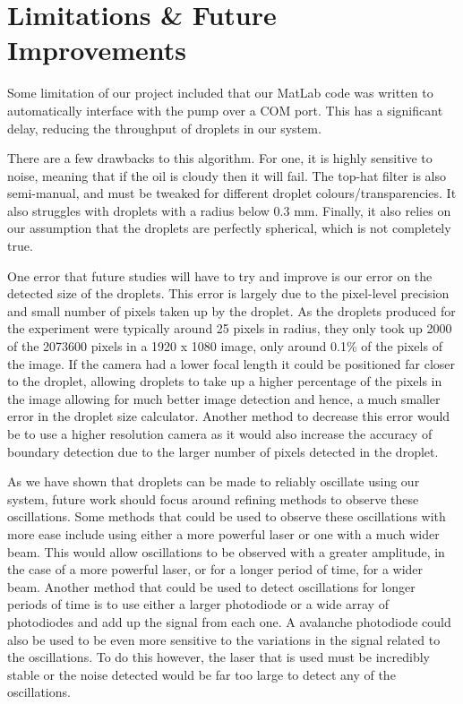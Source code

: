 \documentclass{physics_article_B}
\begin{document}
\section{Limitations \& Future Improvements}

Some limitation of our project included that our MatLab code was written to automatically interface with the pump over a COM port. This has a significant delay, reducing the throughput of droplets in our system.

There are a few drawbacks to this algorithm. For one, it is highly sensitive to noise, meaning that if the oil is cloudy then it will fail. The top-hat filter is also semi-manual, and must be tweaked for different droplet colours/transparencies. It also struggles with droplets with a radius below 0.3 mm. Finally, it also relies on our assumption that the droplets are perfectly spherical, which is not completely true.

One error that future studies will  have to try and improve is our error on the detected size of the droplets. This error is largely due to the pixel-level precision and small number of pixels taken up by the droplet. As the droplets produced for the experiment were typically around 25 pixels in radius, they only took up 2000 of the 2073600 pixels in a 1920 x 1080 image, only around 0.1\% of the pixels of the image. If the camera had a lower focal length it could be positioned far closer to the droplet, allowing droplets to take up a higher percentage of the pixels in the image allowing for much better image detection and hence, a much smaller error in the droplet size calculator. Another method to decrease this error would be to use a higher resolution camera as it would also increase the accuracy of boundary detection due to the larger number of pixels detected in the droplet. 

As we have shown that droplets can be made to reliably oscillate using our system, future work should focus around refining methods to observe these oscillations. Some methods that could be used to observe these oscillations with more ease include using either a more powerful laser or one with a much wider beam. This would allow oscillations to be observed with a greater amplitude, in the case of a more powerful laser, or for a longer period of time, for a wider beam. Another method that could be used to detect oscillations for longer periods of time is to use either a larger photodiode or a wide array of photodiodes and add up the signal from each one. A avalanche photodiode could also be used to be even more sensitive to the variations in the signal related to the oscillations. To do this however, the laser that is used must be incredibly stable or the noise detected would be far too large to detect any of the oscillations. 
\end{document}

